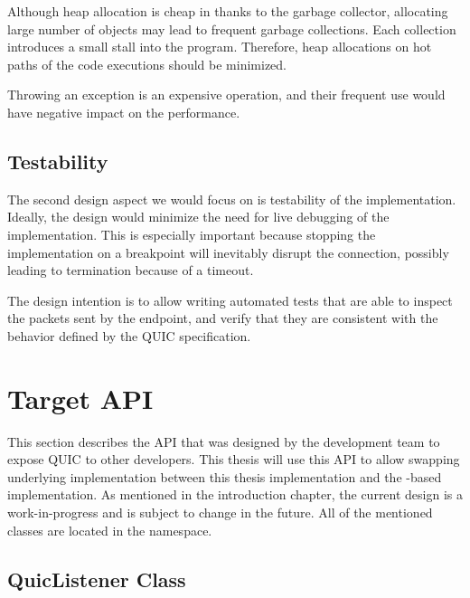 \begin{itemize}

     Although heap allocation is cheap in \dotnet{} thanks
    to the garbage collector, allocating large number of objects may lead to frequent garbage
    collections. Each collection introduces a small stall into the program. Therefore,
    heap allocations on hot paths of the code executions should be minimized.

     Throwing an exception is an expensive operation, and
    their frequent use would have negative impact on the performance.

\end{itemize}

\subsection{Testability}

The second design aspect we would focus on is testability of the implementation. Ideally, the design
would minimize the need for live debugging of the implementation. This is especially important
because stopping the implementation on a breakpoint will inevitably disrupt the connection, possibly
leading to termination because of a timeout.

The design intention is to allow writing automated tests that are able to inspect the packets sent
by the endpoint, and verify that they are consistent with the behavior defined by the QUIC
specification.

\section{Target \dotnet{} API}


This section describes the API that was designed by the \dotnet{} development team to expose QUIC to
other developers. This thesis will use this API to allow swapping underlying implementation between
this thesis implementation and the \libmsquic{}-based implementation. As mentioned in the
introduction chapter, the current design is a work-in-progress and is subject to change in the
future. All of the mentioned classes are located in the  namespace.

\subsection{QuicListener Class}

